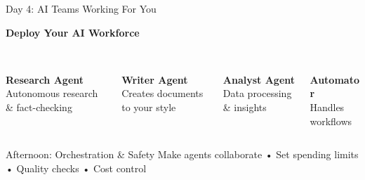 \documentclass{beamer}
\begin{document}
\begin{frame}{Day 4: AI Teams Working For You}
\begin{center}
\Large{\textbf{Deploy Your AI Workforce}}
\end{center}
\vspace{0.5em}
\begin{columns}[T]
\begin{column}{0.25\textwidth}
\centering
\textcolor{aiblue}{\faSearch}\\
\textbf{Research Agent}\\
\small{Autonomous research \& fact-checking}
\end{column}
\begin{column}{0.25\textwidth}
\centering
\textcolor{aiblue}{\faFileAlt}\\
\textbf{Writer Agent}\\
\small{Creates documents to your style}
\end{column}
\begin{column}{0.25\textwidth}
\centering
\textcolor{aiblue}{\faChartLine}\\
\textbf{Analyst Agent}\\
\small{Data processing \& insights}
\end{column}
\begin{column}{0.25\textwidth}
\centering
\textcolor{aiblue}{\faCogs}\\
\textbf{Automator}\\
\small{Handles workflows}
\end{column}
\end{columns}
\vspace{1em}
\begin{block}{Afternoon: Orchestration \& Safety}
Make agents collaborate • Set spending limits • Quality checks • Cost control
\end{block}
\end{frame}
\end{document}
